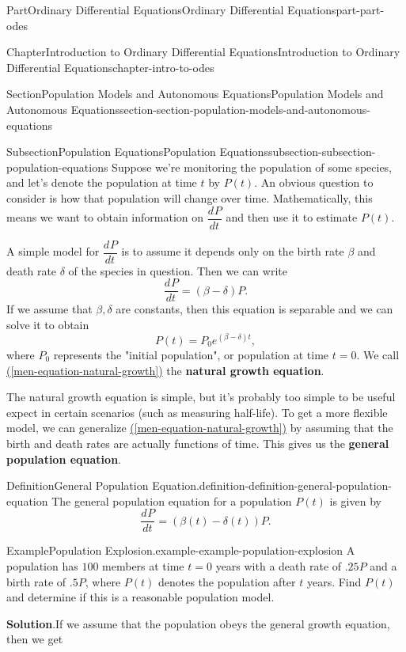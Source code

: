 \documentclass[twoside,10pt,]{book}
\newcommand{\blocktitlefont}{\relax}
\newcommand{\xreffont}{\relax}
\newcommand{\terminology}[1]{\textbf{#1}}
\numberwithin{equation}{part}
\newcommand{\dv}[3][]{\dfrac{d^{#1} #2}{d #3^{#1}}}
\begin{document}
\begin{partptx}{Part}{Ordinary Differential Equations}{}{Ordinary Differential Equations}{}{}{part-part-odes}
\begin{chapterptx}{Chapter}{Introduction to Ordinary Differential Equations}{}{Introduction to Ordinary Differential Equations}{}{}{chapter-intro-to-odes}
\begin{sectionptx}{Section}{Population Models and Autonomous Equations}{}{Population Models and Autonomous Equations}{}{}{section-section-population-models-and-autonomous-equations}
\begin{subsectionptx}{Subsection}{Population Equations}{}{Population Equations}{}{}{subsection-subsection-population-equations}
Suppose we're monitoring the population of some species, and let's denote the population at time \(t\) by \(P(t)\). An obvious question to consider is how that population will change over time. Mathematically, this means we want to obtain information on \(\dv{P}{t}\) and then use it to estimate \(P(t)\).%
\par
A simple model for \(\dv{P}{t}\) is to assume it depends only on the birth rate \(\beta\) and death rate \(\delta\) of the species in question. Then we can write%
\begin{equation}
\dv{P}{t} = (\beta - \delta)P.\label{men-equation-natural-growth}
\end{equation}
If we assume that \(\beta,\delta\) are constants, then this equation is separable and we can solve it to obtain%
\begin{equation*}
P(t) = P_{0}e^{(\beta - \delta)t},
\end{equation*}
where \(P_{0}\) represents the "initial population", or population at time \(t = 0\). We call \hyperref[men-equation-natural-growth]{({\xreffont\ref{men-equation-natural-growth}})} the \terminology{natural growth equation}.%
\par
The natural growth equation is simple, but it's probably too simple to be useful expect in certain scenarios (such as measuring half-life). To get a more flexible model, we can generalize \hyperref[men-equation-natural-growth]{({\xreffont\ref{men-equation-natural-growth}})} by assuming that the birth and death rates are actually functions of time. This gives us the \terminology{general population equation}.%
\begin{definition}{Definition}{General Population Equation.}{definition-definition-general-population-equation}%
The general population equation for a population \(P(t)\) is given by%
\begin{equation*}
\dv{P}{t} = (\beta(t) - \delta(t))P.
\end{equation*}
%
\end{definition}
\begin{example}{Example}{Population Explosion.}{example-example-population-explosion}%
A population has \(100\) members at time \(t = 0\) years with a death rate of \(.25P\) and a birth rate of \(.5P\), where \(P(t)\) denotes the population after \(t\) years. Find \(P(t)\) and determine if this is a reasonable population model.%
\par\smallskip%
\noindent\textbf{\blocktitlefont Solution}.\hypertarget{solution-example-population-explosion-c}{}\quad{}If we assume that the population obeys the general growth equation, then we get%

\end{example}
\end{subsectionptx}
\end{sectionptx}
\end{chapterptx}
\end{partptx}
\end{document}
